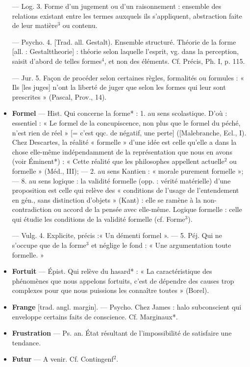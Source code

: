 \begin{itemize}[leftmargin=1cm, label=, itemsep=1pt]
— Log. 3. Forme d'un jugement
ou d'un raisonnement : ensemble des
relations existant entre les termes
auxquels ils s'appliquent, abstraction faite de leur matière$^3$ ou contenu.

— Psycho. 4. [Trad. all. Gestalt).
Ensemble structuré. Théorie de la
forme [all. : Gestalttheorie] : théorie selon laquelle l'esprit, vg. dans
la perception, saisit d’abord de
telles formes$^4$, et non des éléments.
Cf. Précis, Ph. I, p. 115.

— Jur. 5. Façon de procéder
selon certaines règles, formalités ou
formules : « Ils [les juges] n’ont la
liberté de juger que selon les formes
qui leur sont prescrites » (Pascal,
Prov., 14).

\item {\bf Formel} — Hist. Qui concerne la
forme* : 1. au sens scolastique. D'où :
essentiel : « Le formel de la concupiscence, non plus que le formel du
péché, n'est rien de réel » [= c’est
qqc. de négatif, une perte] ([Malebranche, Ecl., I). Chez Descartes, la
réalité « formelle » d’une idée est celle
qu’elle a dans la chose elle-même
indépendamment de la représentation que nous en avons (voir Éminent*) : « Cette réalité que les philosophes appellent actuelle$^2$ ou formelle » (Méd., III); — 2. au sens
Kantien : « morale purement formelle »; — 8. au sens logique : la
validité formelle (opp. : vérité matérielle) d’une proposition est celle
qui relève des « conditions de l’usage
de l’entendement en gén., sans distinction d'objets » (Kant) : elle se
ramène à la non-contradiction ou
accord de la pensée avec elle-même.
Logique formelle : celle qui étudie
les conditions de la validité formelle (cf. Forme$^3$).

— Vulg. 4. Explicite, précis :« Un
démenti formel ». — 5. Péj. Qui ne
s'occupe que de la forme$^3$ et néglige
le fond : « Une argumentation toute
formelle. »

\item {\bf Fortuit} — Épist. Qui relève du
hasard* : « La caractéristique des
phénomènes que nous appelons
fortuits, c’est de dépendre des
causes trop complexes pour que
nous puissions les connaître toutes »
(Borel).

\item {\bf Frange} [trad. angl. margin]. — Psycho.
Chez James : halo subconscient qui
enveloppe certains faits de conscience. Cf. Marginaux*.

\item {\bf Frustration} — Ps. an. État résultant
de l'impossibilité de satisfaire une
tendance.

\item {\bf Futur} — A venir. Cf. Contingenf$^2$.

	\end{itemize}
